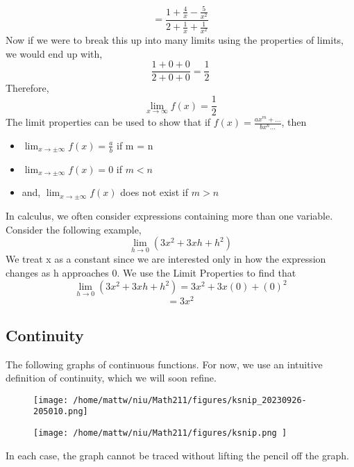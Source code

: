 \documentclass{report}
\begin{document}
$$ = \frac{1 + \frac{4}{x} -\frac{5}{x^2}}{2 + \frac{1}{x} + \frac{1}{x^2}}$$
Now if we were to break this up into many limits using the properties of limits, we would end up with,
$$ \frac{1+0+0}{2+0+0} = \frac{1}{2}$$
Therefore,
$$\displaystyle\lim_{x\to\infty}f(x) = \frac{1}{2}$$
\bigbreak \noindent
  The limit properties can be used to show that if $f(x) = \frac{ax^m + \ldots}{bx^n \ldots}$, then
  \begin{itemize}
    \item $\displaystyle\lim_{x\to \pm\infty}f(x) = \frac{a}{b}$ if m = n
    \item $\displaystyle\lim_{x\to\pm\infty}f(x) = 0$ if $m < n$
    \item and, $\displaystyle\lim_{x\to\pm\infty}f(x)$ does not exist if $m > n$
  \end{itemize}
\pagebreak
In calculus, we often consider expressions containing more than one variable.
Consider the following example,
$$\displaystyle\lim_{h\to 0}(3x^2+3xh+h^2)$$
\bigbreak \noindent
We treat x as a constant since we are interested only in how the expression changes as h approaches 0. We use the Limit Properties to find that
$$\displaystyle\lim_{h\to 0}(3x^2+3xh+h^2) = 3x^2 + 3x(0) + (0)^2 $$
$$ = 3x^2$$
\subsection*{Continuity}
The following graphs of continuous functions. For now, we use an intuitive definition of continuity, which we will soon refine.
\begin{figure}[ht]
\centering
\texttt{[image:  /home/mattw/niu/Math211/figures/ksnip\_20230926-205010.png]}
\end{figure}
\bigbreak \noindent
{}
\begin{figure}[ht]
\centering
\texttt{[image:  /home/mattw/niu/Math211/figures/ksnip.png ]}
\end{figure}
\bigbreak \noindent
In each case, the graph cannot be traced without lifting the pencil off the graph.
\vspace{1.5mm}
\end{document}
